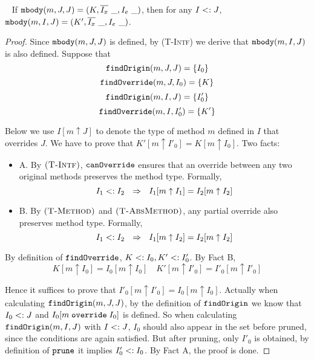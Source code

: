 \begin{lemma}~\label{lemma:mbody_type_preservation}
If $\mbody(m, J, J) = (K, \overline{I_x}\ \_, I_e\ \_)$, then for any $I <: J$, $\texttt{mbody}(m, I, J) = (K', \overline{I_x}\ \_, I_e\ \_)$.
\end{lemma}
\begin{proof}
	
Since $\texttt{mbody}(m, J, J)$ is defined, by \textsc{(T-Intf)} we derive that $\texttt{mbody}(m, I, J)$ is also defined. Suppose that $$\texttt{findOrigin}(m, J, J) = \{I_0\}$$ $$\texttt{findOverride}(m, J, I_0) = \{K\}$$
$$\texttt{findOrigin}(m, I, J) = \{I'_0\}$$ $$\texttt{findOverride}(m, I, I'_0) = \{K'\}$$

Below we use $I[m\uparrow J]$ to denote the type of method $m$ defined in $I$ that overrides $J$. We have to prove that $K'[m\uparrow I'_0] = K[m\uparrow I_0]$.
Two facts:
\begin{itemize}
	\item A. By $\textsc{(T-Intf)}$, $\texttt{canOverride}$ ensures that an override between any two original methods preserves the method type. Formally, $$I_1 \subtype I_2 \ \ \Rightarrow\ \ I_1[m\uparrow I_1] = I_2[m\uparrow I_2]$$
	\item B. By $\textsc{(T-Method)}$ and $\textsc{(T-AbsMethod)}$, any partial override also preserves method type. Formally,
	  $$I_1 <: I_2\ \ \Rightarrow\ \ I_1[m\uparrow I_2] = I_2[m\uparrow I_2]$$
\end{itemize}

By definition of $\texttt{findOverride}$, $K <: I_0, K' <: I'_0$. By Fact B, $$K[m\uparrow I_0] = I_0[m\uparrow I_0] \quad K'[m\uparrow I'_0] = I'_0[m\uparrow I'_0]$$

Hence it suffices to prove that $I'_0[m\uparrow I'_0] = I_0[m\uparrow I_0]$. Actually when calculating $\texttt{findOrigin}(m, J, J)$, by the definition of $\texttt{findOrigin}$ we know that $I_0 <: J$ and $I_0[m \; \texttt{override} \; I_0]$ is defined. So when calculating $\texttt{findOrigin}(m, I, J)$ with $I <: J$, $I_0$ should also appear in the set before pruned, since the conditions are again satisfied. But after pruning, only $I'_0$ is obtained, by definition of $\texttt{prune}$ it implies $I'_0 <: I_0$. By Fact A, the proof is done.

\end{proof}


